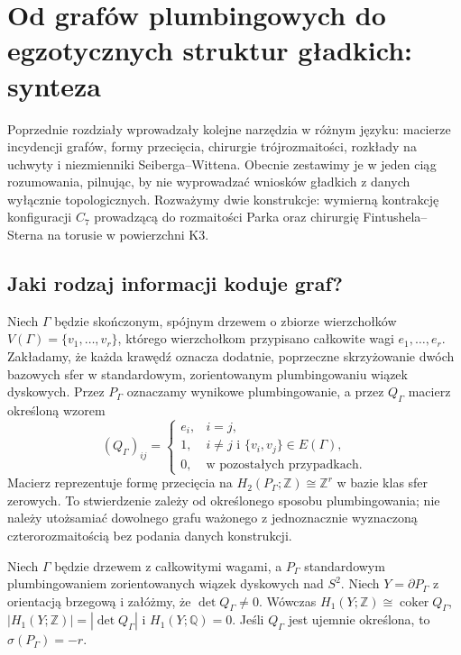 \chapter{Od grafów plumbingowych do egzotycznych struktur gładkich: synteza}
\label{ch:tg-synteza16}

Poprzednie rozdziały wprowadzały kolejne narzędzia w różnym języku:
macierze incydencji grafów, formy przecięcia, chirurgie trójrozmaitości,
rozkłady na uchwyty i niezmienniki Seiberga--Wittena. Obecnie zestawimy
je w jeden ciąg rozumowania, pilnując, by nie wyprowadzać wniosków
gładkich z danych wyłącznie topologicznych. Rozważymy dwie konstrukcje:
wymierną kontrakcję konfiguracji $C_7$ prowadzącą do rozmaitości Parka
oraz chirurgię Fintushela--Sterna na torusie w powierzchni K3.

\section{Jaki rodzaj informacji koduje graf?}
\label{sec:tg-syn-graph}

Niech $\Gamma$ będzie skończonym, spójnym drzewem o zbiorze
wierzchołków $V(\Gamma)=\{v_1,\ldots,v_r\}$, którego wierzchołkom
przypisano całkowite wagi $e_1,\ldots,e_r$. Zakładamy, że każda
krawędź oznacza dodatnie, poprzeczne skrzyżowanie dwóch bazowych sfer
w standardowym, zorientowanym plumbingowaniu wiązek dyskowych.
Przez $P_\Gamma$ oznaczamy wynikowe plumbingowanie, a przez
$Q_\Gamma$ macierz określoną wzorem
\[
 (Q_\Gamma)_{ij}=\begin{cases}
 e_i,&i=j,\\
 1,&i\ne j\text{ i }\{v_i,v_j\}\in E(\Gamma),\\
 0,&\text{w pozostałych przypadkach}.
 \end{cases}
\]
Macierz reprezentuje formę przecięcia na
$H_2(P_\Gamma;\mathbb Z)\cong\mathbb Z^r$ w bazie klas sfer zerowych.
To stwierdzenie zależy od określonego sposobu plumbingowania;
nie należy utożsamiać dowolnego grafu ważonego z jednoznacznie
wyznaczoną czterorozmaitością bez podania danych konstrukcji.

\begin{twierdzenie}
\label{thm:tg-syn-boundary}
Niech $\Gamma$ będzie drzewem z całkowitymi wagami, a
$P_\Gamma$ standardowym plumbingowaniem zorientowanych wiązek
dyskowych nad $S^2$. Niech $Y=\partial P_\Gamma$ z orientacją
brzegową i załóżmy, że $\det Q_\Gamma\ne0$. Wówczas
$H_1(Y;\mathbb Z)\cong\operatorname{coker}Q_\Gamma$,
$|H_1(Y;\mathbb Z)|=|\det Q_\Gamma|$ i
$H_1(Y;\mathbb Q)=0$. Jeśli $Q_\Gamma$ jest ujemnie określona,
to $\sigma(P_\Gamma)=-r$.
\end{twierdzenie}

